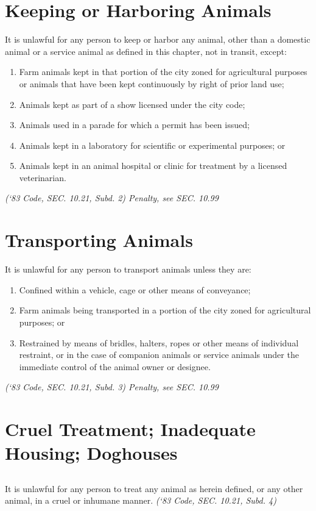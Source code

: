 \documentclass[code.tex]{subfiles}
\begin{document}
\section{Keeping or Harboring Animals}
It is unlawful for any person to keep or harbor any animal, other than a domestic animal or a service animal as defined in this chapter, not in transit, except:
\begin{enumerate}[{\indent}A)]
\item Farm animals kept in that portion of the city zoned for agricultural purposes or animals that have been kept continuously by right of prior land use;
\item Animals kept as part of a show licensed under the city code;
\item Animals used in a parade for which a permit has been issued;
\item Animals kept in a laboratory for scientific or experimental purposes; or
\item Animals kept in an animal hospital or clinic for treatment by a licensed veterinarian.
\end{enumerate}
\emph{(‘83 Code, SEC. 10.21, Subd. 2)  Penalty, see SEC. 10.99}

\section{Transporting Animals}
It is unlawful for any person to transport animals unless they are:
\begin{enumerate}[{\indent}A)]
\item Confined within a vehicle, cage or other means of conveyance;
\item Farm animals being transported in a portion of the city zoned for agricultural purposes; or
\item Restrained by means of bridles, halters, ropes or other means of individual restraint, or in the case of companion animals or service animals under the immediate control of the animal owner or designee.
\end{enumerate}
\emph{(‘83 Code, SEC. 10.21, Subd. 3)  Penalty, see SEC. 10.99}

\section{Cruel Treatment; Inadequate Housing; Doghouses}
\subsection{}
It is unlawful for any person to treat any animal as herein defined, or any other animal, in a cruel or inhumane manner.\newline
\emph{(‘83 Code, SEC. 10.21, Subd. 4)}
\end{document}
